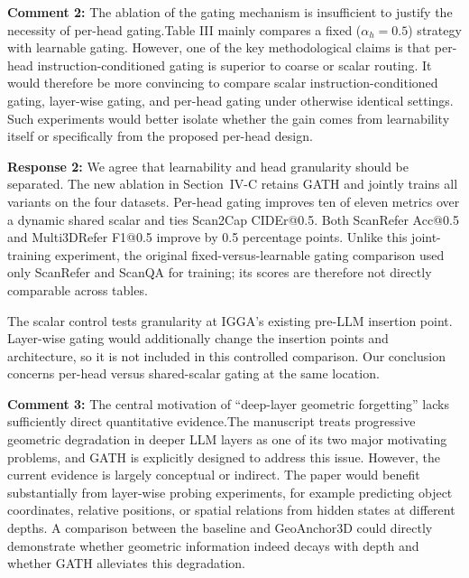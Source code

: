 {\noindent\color{comment}
\textbf{Comment 2:}
The ablation of the gating mechanism is insufficient to justify the necessity of per-head gating.Table III mainly compares a fixed ($\alpha_h=0.5$) strategy with learnable gating. However, one of the key methodological claims is that per-head instruction-conditioned gating is superior to coarse or scalar routing.  It would therefore be more convincing to compare scalar instruction-conditioned gating, layer-wise gating, and per-head gating under otherwise identical settings. Such experiments would better isolate whether the gain comes from learnability itself or specifically from the proposed per-head design.
}\vspace{\comafter}

\noindent\textbf{Response 2:}
We agree that learnability and head granularity should be separated. The new ablation in Section~IV-C retains GATH and jointly trains all variants on the four datasets. Per-head gating improves ten of eleven metrics over a dynamic shared scalar and ties Scan2Cap CIDEr@0.5. Both ScanRefer Acc@0.5 and Multi3DRefer F1@0.5 improve by 0.5 percentage points. Unlike this joint-training experiment, the original fixed-versus-learnable gating comparison used only ScanRefer and ScanQA for training; its scores are therefore not directly comparable across tables.

The scalar control tests granularity at IGGA's existing pre-LLM insertion point. Layer-wise gating would additionally change the insertion points and architecture, so it is not included in this controlled comparison. Our conclusion concerns per-head versus shared-scalar gating at the same location.
\vspace{\resafter}


{\noindent\color{comment}
\textbf{Comment 3:}
The central motivation of ``deep-layer geometric forgetting'' lacks sufficiently direct quantitative evidence.The manuscript treats progressive geometric degradation in deeper LLM layers as one of its two major motivating problems, and GATH is explicitly designed to address this issue.  However, the current evidence is largely conceptual or indirect. The paper would benefit substantially from layer-wise probing experiments, for example predicting object coordinates, relative positions, or spatial relations from hidden states at different depths. A comparison between the baseline and GeoAnchor3D could directly demonstrate whether geometric information indeed decays with depth and whether GATH alleviates this degradation.
}\vspace{\comafter}

